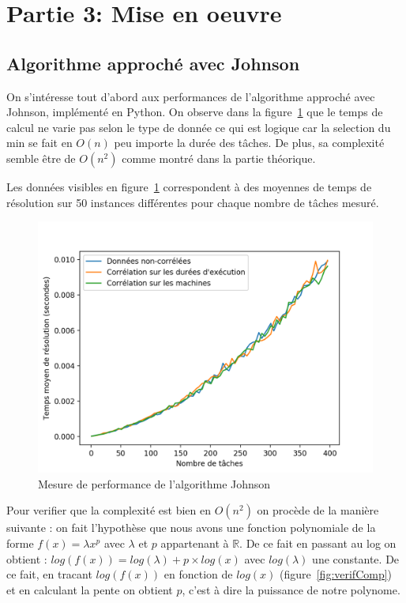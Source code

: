 \documentclass[a4paper, 10pt]{article}
\begin{document}
	\section*{Partie 3: Mise en oeuvre}
		\subsection*{Algorithme approché avec Johnson}
		
		On s'intéresse tout d'abord aux performances de l'algorithme approché avec Johnson, implémenté en Python. On observe dans la figure~\ref{fig:tj} que le temps de calcul ne varie pas selon le type de donnée ce qui est logique car la selection du min se fait en $O(n)$ peu importe la durée des tâches. De plus, sa complexité semble être de $O(n^2)$ comme montré dans la partie théorique.
		
		Les données visibles en figure~\ref{fig:tj} correspondent à des moyennes de temps de résolution sur 50 instances différentes pour chaque nombre de tâches mesuré.
		
		\begin{figure}[H]
			\centering
			\includegraphics[width=0.75\linewidth]{graphes/Johnson.png}
			\caption{Mesure de performance de l'algorithme Johnson}
			\label{fig:tj}
		\end{figure}

        Pour verifier que la complexité est bien en $O(n^2)$ on procède de la manière suivante : on fait l'hypothèse que nous avons une fonction polynomiale de la forme $f(x) = \lambda x^p$ avec $\lambda$ et $p$ appartenant à $\mathbb{R}$. De ce fait en passant au log on obtient : $log(f(x)) = log(\lambda) + p \times log(x)$ avec $log(\lambda)$ une constante. De ce fait, en tracant $log(f(x))$ en fonction de $log(x)$ (figure~\ref{fig:verifComp}) et en calculant la pente on obtient $p$, c'est à dire la puissance de notre polynome.
\end{document}
